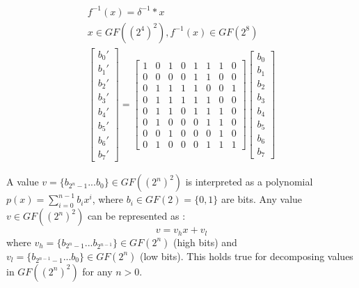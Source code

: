 \begin{equation}
\begin{gathered}
\label{eq:iso_map_rev}
f^{-1}(x) = \delta^{-1} * x\\
x \in GF((2^4)^2), f^{-1}(x) \in GF(2^8) \\
\begin{bmatrix}
b_0'\\b_1'\\b_2'\\b_3'\\b_4'\\b_5'\\b_6'\\b_7'
\end{bmatrix}
=
\begin{bmatrix}
    1 & 0 & 1 & 0 & 1 & 1 & 1 & 0 \\
    0 & 0 & 0 & 0 & 1 & 1 & 0 & 0 \\
    0 & 1 & 1 & 1 & 1 & 0 & 0 & 1 \\
    0 & 1 & 1 & 1 & 1 & 1 & 0 & 0 \\
    0 & 1 & 1 & 0 & 1 & 1 & 1 & 0 \\
    0 & 1 & 0 & 0 & 0 & 1 & 1 & 0 \\
    0 & 0 & 1 & 0 & 0 & 0 & 1 & 0 \\
    0 & 1 & 0 & 0 & 0 & 1 & 1 & 1
\end{bmatrix}
\begin{bmatrix}
b_0\\b_1\\b_2\\b_3\\b_4\\b_5\\b_6\\b_7
\end{bmatrix}
\end{gathered}
\end{equation}

A value $v = \{b_{2^n-1}...b_0\} \in GF((2^n)^2)$ is interpreted as a polynomial $p(x) = \sum_{i=0}^{n-1} b_ix^i$, where $b_i \in GF(2) = \{0, 1\}$ are bits. Any value $v \in GF((2^n)^2)$ can be represented as \cite{vlsi}:
\begin{equation}
\label{eq:poly_repr}
v = v_hx + v_l
\end{equation}
where $v_h = \{b_{2^n-1}...b_{2^{n-1}}\} \in GF(2^n)$ (high bits) and $v_l = \{b_{2^{n-1}-1}...b_0\} \in GF(2^n)$ (low bits). This holds true for decomposing values in $GF((2^n)^2)$ for any $n > 0$.

